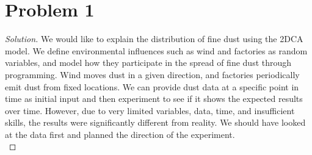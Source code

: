 \section*{Problem 1}
	\begin{proof} [Solution]
		We would like to explain the distribution of fine dust using the 2DCA model. We define environmental influences such as wind and factories as random variables, and model how they participate in the spread of fine dust through programming. Wind moves dust in a given direction, and factories periodically emit dust from fixed locations. We can provide dust data at a specific point in time as initial input and then experiment to see if it shows the expected results over time. However, due to very limited variables, data, time, and insufficient skills, the results were significantly different from reality. We should have looked at the data first and planned the direction of the experiment.\\
	\end{proof}